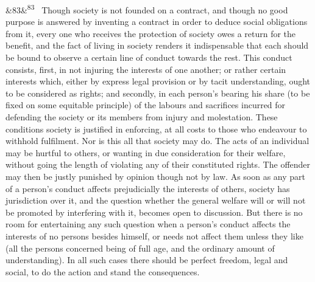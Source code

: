 \documentclass[12pt]{article}
\newcommand{\para}[1][]{\par\noindent\ifx&#1&\else\textsuperscript{\footnotesize #1}~\fi}
\begin{document}
\para[83] Though society is not founded on a contract, and though no good purpose is answered by inventing a contract in order to deduce social obligations from it, every one who receives the protection of society owes a return for the benefit, and the fact of living in society renders it indispensable that each should be bound to observe a certain line of conduct towards the rest. This conduct consists, first, in not injuring the interests of one another; or rather certain interests which, either by express legal provision or by tacit understanding, ought to be considered as rights; and secondly, in each person's bearing his share (to be fixed on some equitable principle) of the labours and sacrifices incurred for defending the society or its members from injury and molestation. These conditions society is justified in enforcing, at all costs to those who endeavour to withhold fulfilment. Nor is this all that society may do. The acts of an individual may be hurtful to others, or wanting in due consideration for their welfare, without going the length of violating any of their constituted rights. The offender may then be justly punished by opinion though not by law. As soon as any part of a person's conduct affects prejudicially the interests of others, society has jurisdiction over it, and the question whether the general welfare will or will not be promoted by interfering with it, becomes open to discussion. But there is no room for entertaining any such question when a person's conduct affects the interests of no persons besides himself, or needs not affect them unless they like (all the persons concerned being of full age, and the ordinary amount of understanding). In all such cases there should be perfect freedom, legal and social, to do the action and stand the consequences.
\end{document}
